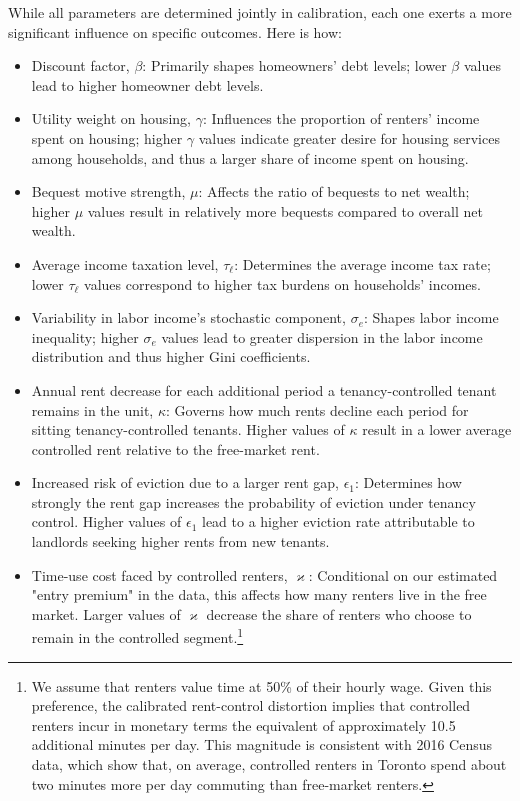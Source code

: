 \documentclass[parskip=full]{article}
\begin{document}
While all parameters are determined jointly in calibration, each one exerts a more significant influence on specific outcomes. Here is how:
\begin{itemize}
    \item Discount factor, $\beta$: Primarily shapes homeowners' debt levels; lower $\beta$ values lead to higher homeowner debt levels.
    \item Utility weight on housing, $\gamma$: Influences the proportion of renters' income spent on housing; higher $\gamma$ values indicate greater desire for housing services among households, and thus a larger share of income spent on housing.
    \item Bequest motive strength, $\mu$: Affects the ratio of bequests to net wealth; higher $\mu$ values result in relatively more bequests compared to overall net wealth.
    \item Average income taxation level, $\tau_{\ell}$: Determines the average income tax rate; lower $\tau_{\ell}$ values correspond to higher tax burdens on households' incomes.
    \item Variability in labor income's stochastic component, $\sigma_{e}$: Shapes labor income inequality; higher $\sigma_{e}$ values lead to greater dispersion in the labor income distribution and thus higher Gini coefficients.
    \item Annual rent decrease for each additional period a tenancy-controlled tenant remains in the unit, $\kappa$: Governs how much rents decline each period for sitting tenancy-controlled tenants. Higher values of $\kappa$ result in a lower average controlled rent relative to the free-market rent.
    \item Increased risk of eviction due to a larger rent gap, $\epsilon_1$: Determines how strongly the rent gap increases the probability of eviction under tenancy control. Higher values of $\epsilon_1$ lead to a higher eviction rate attributable to landlords seeking higher rents from new tenants.
    \item Time-use cost faced by controlled renters, $\varkappa$: Conditional on our estimated "entry premium" in the data, this affects how many renters live in the free market. Larger values of $\varkappa$ decrease the share of renters who choose to remain in the controlled segment.\footnote{We assume that renters value time at 50\% of their hourly wage. Given this preference, the calibrated rent-control distortion implies that controlled renters incur in monetary terms the equivalent of approximately 10.5 additional minutes per day. This magnitude is consistent with 2016 Census data, which show that, on average, controlled renters in Toronto spend about two minutes more per day commuting than free-market renters.}

\end{itemize}
\end{document}
